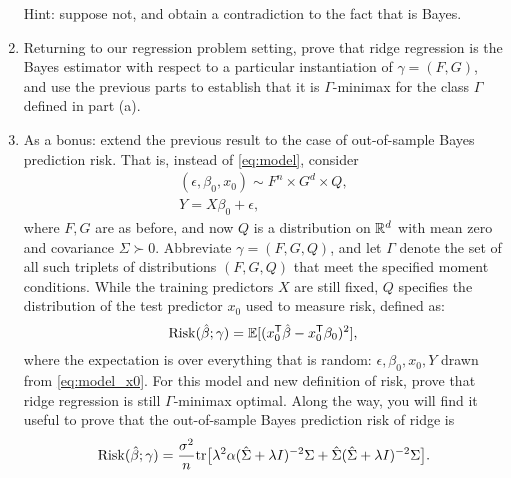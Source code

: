 \documentclass{article}
\begin{document}
\begin{enumerate}[label=(\alph*)]
  Hint: suppose not, and obtain a contradiction to the fact that
   is Bayes. 

\item Returning to our regression problem setting, prove that ridge regression
  is the Bayes estimator with respect to a particular instantiation of $\gamma = 
  (F,G)$, and use the previous parts to establish that it is $\Gamma$-minimax
  for the class $\Gamma$ defined in part (a).  
  \marginpar{\small [3 pts]}

\item As a bonus: extend the previous result to the case of out-of-sample Bayes
  prediction risk. That is, instead of \eqref{eq:model}, consider
  \begin{equation}
  \label{eq:model_x0}
  \begin{gathered}
  (\epsilon, \beta_0,  x_0) \sim F^n \times G^d \times Q, \\
  Y = X\beta_0 + \epsilon,
  \end{gathered}
  \end{equation}
  where $F,G$ are as before, and now $Q$ is a distribution on $\mathbb{R}^d$ with mean
  zero and covariance $\Sigma \succ 0$. Abbreviate $\gamma = (F,G,Q)$, and let
  $\Gamma$ denote the set of all such triplets of distributions $(F,G,Q)$ that
  meet the specified moment conditions. While the training predictors $X$ are
  still fixed, $Q$ specifies the distribution of the test predictor $x_0$ used
  to measure risk, defined as: 
  \[
  \mathrm{Risk}(\hat{\beta}; \gamma) = \mathbb{E}[ (x_0^{\mathsf{T}} \hat{\beta} - x_0^{\mathsf{T}} \beta_0)^2 ], 
  \]
  where the expectation is over everything that is random: $\epsilon, \beta_0,
  x_0, Y$ drawn from \eqref{eq:model_x0}. For this model and new definition of
  risk, prove that ridge regression is still $\Gamma$-minimax optimal. Along the
  way, you will find it useful to prove that the out-of-sample Bayes prediction 
  risk of ridge is  
  \[
  \mathrm{Risk}(\hat{\beta}; \gamma) = \frac{\sigma^2}{n} \mathrm{tr} \big[ \lambda^2 \alpha (\hat\Sigma
  + \lambda I)^{-2} \Sigma + \hat\Sigma ( \hat\Sigma + \lambda I)^{-2} \Sigma \big].
  \]
\end{enumerate}



\end{document}

